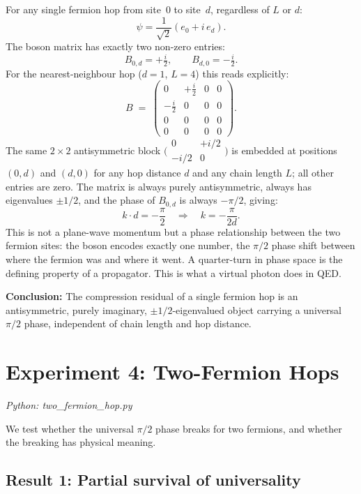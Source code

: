\documentclass[11pt]{article}
\begin{document}
For any single fermion hop from site~$0$ to site~$d$, regardless of $L$ or $d$:
\[
  \psi = \frac{1}{\sqrt{2}}(e_0 + i\,e_d).
\]
The boson matrix has exactly two non-zero entries:
\[
  B_{0,d} = +\tfrac{i}{2}, \qquad B_{d,0} = -\tfrac{i}{2}.
\]
For the nearest-neighbour hop ($d=1$, $L=4$) this reads explicitly:
\[
  B \;=\;
  \begin{pmatrix}
    0 & +\tfrac{i}{2} & 0 & 0 \\[4pt]
    -\tfrac{i}{2} & 0 & 0 & 0 \\[4pt]
    0 & 0 & 0 & 0 \\[4pt]
    0 & 0 & 0 & 0
  \end{pmatrix}.
\]
The same $2\times 2$ antisymmetric block $\bigl(\begin{smallmatrix}0&+i/2\\-i/2&0\end{smallmatrix}\bigr)$
is embedded at positions $(0,d)$ and $(d,0)$ for any hop distance $d$ and
any chain length $L$; all other entries are zero.
The matrix is always purely antisymmetric, always has eigenvalues $\pm 1/2$,
and the phase of $B_{0,d}$ is always $-\pi/2$, giving:
\[
  k \cdot d = -\frac{\pi}{2}
  \quad\Longrightarrow\quad
  k = -\frac{\pi}{2d}.
\]
This is not a plane-wave momentum but a phase relationship between the two
fermion sites: the boson encodes exactly one number, the $\pi/2$ phase shift
between where the fermion was and where it went.
A quarter-turn in phase space is the defining property of a propagator.
This is what a virtual photon does in QED.

\textbf{Conclusion:} The compression residual of a single fermion hop is an
antisymmetric, purely imaginary, $\pm 1/2$-eigenvalued object carrying a
universal $\pi/2$ phase, independent of chain length and hop distance.

\section{Experiment 4: Two-Fermion Hops}
\label{sec:exp4}

\textit{Python: two\_fermion\_hop.py}

We test whether the universal $\pi/2$ phase breaks for two fermions, and
whether the breaking has physical meaning.

\subsection*{Result 1: Partial survival of universality}
\end{document}
